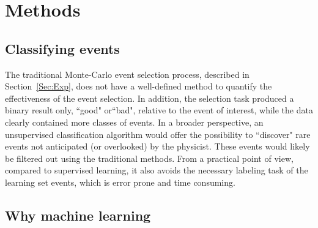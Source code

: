 \documentclass[review,number,sort&compress]{elsarticle}
\begin{document}
\section{Methods}\label{sec:methods}

\subsection{Classifying  events} 
The traditional Monte-Carlo event selection process, described in Section~\ref{Sec:Exp}, does not have a well-defined method to quantify the effectiveness of the event selection.
In addition, the selection task produced a binary result only, ``good" or``bad", relative to the event of interest, while the data clearly contained more classes of events.%
In a broader perspective, an unsupervised classification algorithm would offer the possibility to ``discover" rare events not anticipated (or overlooked) by the physicist. These events would likely be filtered out using the traditional methods. From a practical point of view, compared to supervised learning, it also avoids the necessary labeling task of the learning set events, which is error prone and time consuming.

\subsection{Why machine learning}
\end{document}
